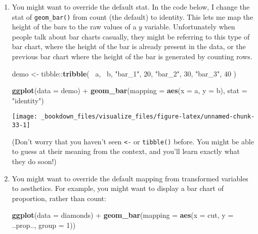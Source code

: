 \documentclass[]{book}
\newenvironment{Shaded}{\begin{snugshade}}{\end{snugshade}}
\newcommand{\KeywordTok}[1]{\textcolor[rgb]{0.13,0.29,0.53}{\textbf{{#1}}}}
\newcommand{\DataTypeTok}[1]{\textcolor[rgb]{0.13,0.29,0.53}{{#1}}}
\newcommand{\DecValTok}[1]{\textcolor[rgb]{0.00,0.00,0.81}{{#1}}}
\newcommand{\StringTok}[1]{\textcolor[rgb]{0.31,0.60,0.02}{{#1}}}
\newcommand{\NormalTok}[1]{{#1}}
\begin{document}
\begin{enumerate}
\def\labelenumi{\arabic{enumi}.}
\item
  You might want to override the default stat. In the code below, I
  change the stat of \texttt{geom\_bar()} from count (the default) to
  identity. This lets me map the height of the bars to the raw values of
  a \(y\) variable. Unfortunately when people talk about bar charts
  casually, they might be referring to this type of bar chart, where the
  height of the bar is already present in the data, or the previous bar
  chart where the height of the bar is generated by counting rows.

\begin{Shaded}
\begin{Highlighting}[]
\NormalTok{demo <-}\StringTok{ }\NormalTok{tibble::}\KeywordTok{tribble}\NormalTok{(}
  \NormalTok{~a,      ~b,}
  \StringTok{"bar_1"}\NormalTok{, }\DecValTok{20}\NormalTok{,}
  \StringTok{"bar_2"}\NormalTok{, }\DecValTok{30}\NormalTok{,}
  \StringTok{"bar_3"}\NormalTok{, }\DecValTok{40}
\NormalTok{)}

\KeywordTok{ggplot}\NormalTok{(}\DataTypeTok{data =} \NormalTok{demo) +}
\StringTok{  }\KeywordTok{geom_bar}\NormalTok{(}\DataTypeTok{mapping =} \KeywordTok{aes}\NormalTok{(}\DataTypeTok{x =} \NormalTok{a, }\DataTypeTok{y =} \NormalTok{b), }\DataTypeTok{stat =} \StringTok{"identity"}\NormalTok{)}
\end{Highlighting}
\end{Shaded}

  \begin{center}\texttt{[image: \_bookdown\_files/visualize\_files/figure-latex/unnamed-chunk-33-1]} \end{center}

  (Don't worry that you haven't seen \texttt{\textless{}-} or
  \texttt{tibble()} before. You might be able to guess at their meaning
  from the context, and you'll learn exactly what they do soon!)
\item
  You might want to override the default mapping from transformed
  variables to aesthetics. For example, you might want to display a bar
  chart of proportion, rather than count:

\begin{Shaded}
\begin{Highlighting}[]
\KeywordTok{ggplot}\NormalTok{(}\DataTypeTok{data =} \NormalTok{diamonds) +}\StringTok{ }
\StringTok{  }\KeywordTok{geom_bar}\NormalTok{(}\DataTypeTok{mapping =} \KeywordTok{aes}\NormalTok{(}\DataTypeTok{x =} \NormalTok{cut, }\DataTypeTok{y =} \NormalTok{..prop.., }\DataTypeTok{group =} \DecValTok{1}\NormalTok{))}
\end{Highlighting}
\end{Shaded}


\end{enumerate}
\end{document}
